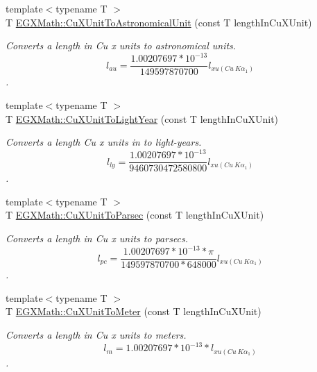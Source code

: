 \begin{DoxyCompactItemize}
\item 
{\footnotesize template$<$typename T $>$ }\\T \mbox{\hyperlink{group___e_g_x_math-_conversions-_length_conversions-_non-_s_i-_cu_x_unit-_astronomical_ga4e500b2f41ef6b9da3270da104a5b6fa}{E\+G\+X\+Math\+::\+Cu\+X\+Unit\+To\+Astronomical\+Unit}} (const T length\+In\+Cu\+X\+Unit)
\begin{DoxyCompactList}\small\item\em Converts a length in Cu x units to astronomical units. \[ l_{au}= \frac{1.00207697*10^{-13}}{149597870700} l_{xu(Cu\ K\alpha_1)} \]. \end{DoxyCompactList}\item 
{\footnotesize template$<$typename T $>$ }\\T \mbox{\hyperlink{group___e_g_x_math-_conversions-_length_conversions-_non-_s_i-_cu_x_unit-_astronomical_gaf00800997b3a20104d220f4487505cf4}{E\+G\+X\+Math\+::\+Cu\+X\+Unit\+To\+Light\+Year}} (const T length\+In\+Cu\+X\+Unit)
\begin{DoxyCompactList}\small\item\em Converts a length Cu x units in to light-\/years. \[ l_{ly}= \frac{1.00207697*10^{-13}}{9460730472580800} l_{xu(Cu\ K\alpha_1)} \]. \end{DoxyCompactList}\item 
{\footnotesize template$<$typename T $>$ }\\T \mbox{\hyperlink{group___e_g_x_math-_conversions-_length_conversions-_non-_s_i-_cu_x_unit-_astronomical_ga53035d7a668e8d79bdfa0dac5322e554}{E\+G\+X\+Math\+::\+Cu\+X\+Unit\+To\+Parsec}} (const T length\+In\+Cu\+X\+Unit)
\begin{DoxyCompactList}\small\item\em Converts a length in Cu x units to parsecs. \[ l_{pc}=\frac{1.00207697*10^{-13} * \pi}{149597870700 * 648000} l_{xu(Cu\ K\alpha_1)} \]. \end{DoxyCompactList}\item 
{\footnotesize template$<$typename T $>$ }\\T \mbox{\hyperlink{group___e_g_x_math-_conversions-_length_conversions-_non-_s_i-_cu_x_unit-_s_i_ga2879f79428ad854a11b3309d893ef9f7}{E\+G\+X\+Math\+::\+Cu\+X\+Unit\+To\+Meter}} (const T length\+In\+Cu\+X\+Unit)
\begin{DoxyCompactList}\small\item\em Converts a length in Cu x units to meters. \[ l_{m}=1.00207697*10^{-13} * l_{xu(Cu\ K\alpha_1)} \]. \end{DoxyCompactList}\item 

\end{DoxyCompactItemize}
